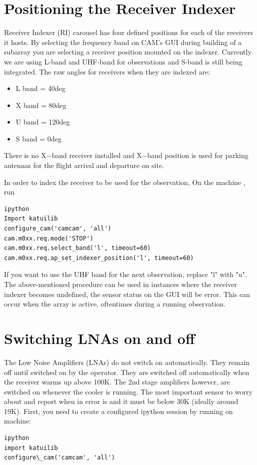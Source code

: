 \section{Positioning the Receiver Indexer}

Receiver Indexer (RI) carousel has four defined positions for each of the receivers it hosts. By selecting the frequency band on CAM’s  GUI during building of a subarray you are selecting a receiver position mounted on the indexer. Currently we are using L-band and UHF-band for observations and S-band is still being integrated. The raw angles for receivers when they are indexed are:
\begin{itemize}
\item{} L band = 40deg
\item{} X band = 80deg
\item{} U band = 120deg
\item{} S band = 0deg
\end{itemize}

There is no X$-$band receiver installed and X$-$band position is used for parking antennas for the flight arrival and departure on site. 

In order to index the receiver to be used for the observation, On the  machine ,  run
\begin{lstlisting}[style=DOS]
ipython
Import katuilib
configure_cam('camcam', 'all')
cam.m0xx.req.mode('STOP') 
cam.m0xx.req.select_band('l', timeout=60)   
cam.m0xx.req.ap_set_indexer_position('l', timeout=60)

\end{lstlisting}
	

If you want to use the UHF band for the next observation, replace "l" with "u".  \\

The above-mentioned procedure can be used in instances where the receiver indexer becomes undefined, the  sensor status on the GUI will be error. This can occur when the array is active, oftentimes during a running observation. 
\section{Switching LNAs on and off}

The Low Noise Amplifiers (LNAs) do not switch on automatically. They remain off until switched on by the operator. They are switched off automatically when the receiver warms up above 100\unit{K}. The 2nd stage amplifiers however, are switched on whenever the cooler is running. The most important sensor to worry about and report  when in error is   
and it must be below 30\unit{K} (ideally around 19\unit{K}). First, you need to create a configured ipython session by running on  machine:
\begin{lstlisting}[style=DOS]
ipython
import katuilib
configure\_cam('camcam', 'all')

\end{lstlisting}


